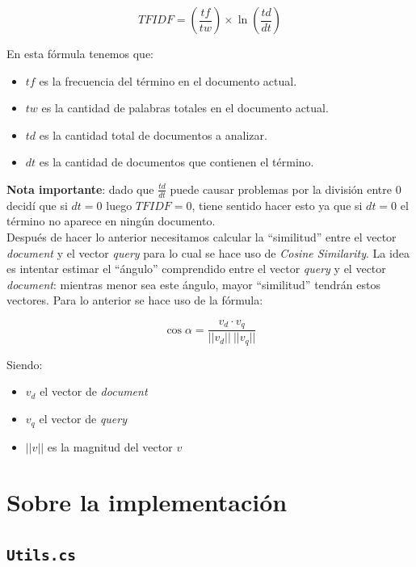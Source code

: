 \documentclass[a4paper, 12pt]{report}
\begin{document}
\begin{equation}
	TFIDF = (\frac{tf}{tw}) \times \ln(\frac{td}{dt})
\end{equation}

En esta fórmula tenemos que:
\begin{itemize}
	\item $tf$ es la frecuencia del término en el documento actual.
	\item $tw$ es la cantidad de palabras totales en el documento actual.
	\item $td$ es la cantidad total de documentos a analizar.
	\item $dt$ es la cantidad de documentos que contienen el término.
\end{itemize}

{\bf \color{red} Nota importante}: dado que $\frac{td}{dt}$ puede causar problemas por la
división entre $0$ decidí que si $dt = 0$ luego $TFIDF = 0$, tiene sentido hacer esto ya
que si $dt = 0$ el término no aparece en ningún documento.\\

Después de hacer lo anterior necesitamos calcular la ``similitud'' entre el
vector {\it document} y el vector {\it query} para lo cual se hace uso de {\it
		Cosine Similarity}. La idea es intentar estimar el ``ángulo'' comprendido entre
el vector {\it query} y el vector {\it document}: mientras menor sea este
ángulo, mayor ``similitud'' tendrán estos vectores. Para lo anterior se hace
uso de la f\'ormula:

\begin{equation}
	\cos \alpha = \frac{v_d \cdot v_q}{||v_d|| ~ ||v_q||}
\end{equation}

Siendo:

\begin{itemize}
	\item $v_d$ el vector de {\it document}
	\item $v_q$ el vector de {\it query}
	\item $||v||$ es la magnitud del vector $v$
\end{itemize}

\section*{Sobre la implementaci\'on}

\subsection*{\tt Utils.cs}
\end{document}
